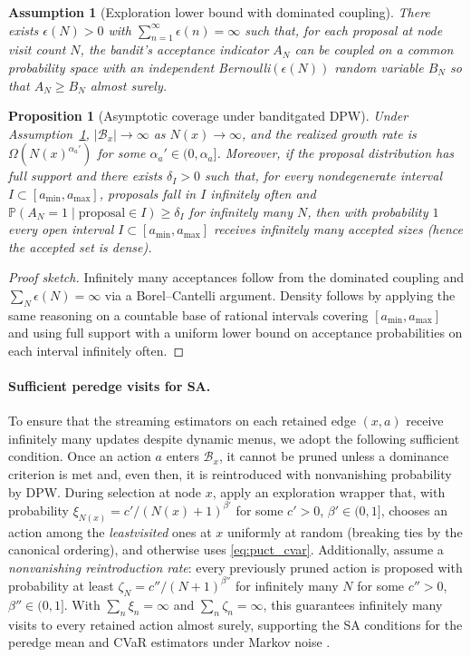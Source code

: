 \documentclass[10pt]{article}
\newcommand{\1}{\mathbf{1}}
\theoremstyle{plain}
\newtheorem{assumption}{Assumption}
\newtheorem{proposition}{Proposition}
\begin{document}
\begin{assumption}[Exploration lower bound with dominated coupling]
\label{ass:bandit}
There exists $\epsilon(N)>0$ with $\sum_{n=1}^\infty \epsilon(n)=\infty$ such that, for each proposal at node visit count $N$, the bandit’s acceptance indicator $A_N$ can be coupled on a common probability space with an \emph{independent} Bernoulli$(\epsilon(N))$ random variable $B_N$ so that $A_N\ge B_N$ almost surely.
\end{assumption}
\begin{proposition}[Asymptotic coverage under bandit\textendash gated DPW]
Under Assumption~\ref{ass:bandit}, $|\mathcal{B}_x|\to\infty$ as $N(x)\to\infty$, and the realized growth rate is $\Omega(N(x)^{\alpha_a'})$ for some $\alpha_a'\in(0,\alpha_a]$. Moreover, if the proposal distribution has full support and there exists $\delta_I>0$ such that, for every nondegenerate interval $I\subset[a_{\min},a_{\max}]$, proposals fall in $I$ infinitely often and $\mathbb{P}(A_N=1\mid \text{proposal}\in I)\ge \delta_I$ for infinitely many $N$, then with probability $1$ every open interval $I\subset[a_{\min},a_{\max}]$ receives infinitely many accepted sizes (hence the accepted set is dense).
\end{proposition}
\begin{proof}[Proof sketch]
Infinitely many acceptances follow from the dominated coupling and $\sum_N \epsilon(N)=\infty$ via a Borel--Cantelli argument. Density follows by applying the same reasoning on a countable base of rational intervals covering $[a_{\min},a_{\max}]$ and using full support with a uniform lower bound on acceptance probabilities on each interval infinitely often.
\end{proof}

\paragraph{Sufficient per\textendash edge visits for SA.}
To ensure that the streaming estimators on each retained edge $(x,a)$ receive infinitely many updates despite dynamic menus, we adopt the following sufficient condition. Once an action $a$ enters $\mathcal{B}_x$, it cannot be pruned unless a dominance criterion is met and, even then, it is reintroduced with nonvanishing probability by DPW. During selection at node $x$, apply an exploration wrapper that, with probability $\xi_{N(x)}=c'/(N(x)+1)^{\beta'}$ for some $c'>0$, $\beta'\in(0,1]$, chooses an action among the \emph{least\textendash visited} ones at $x$ uniformly at random (breaking ties by the canonical ordering), and otherwise uses \eqref{eq:puct_cvar}. Additionally, assume a \emph{nonvanishing reintroduction rate}: every previously pruned action is proposed with probability at least $\zeta_N=c''/(N+1)^{\beta''}$ for infinitely many $N$ for some $c''>0$, $\beta''\in(0,1]$. With $\sum_n \xi_n=\infty$ and $\sum_n \zeta_n=\infty$, this guarantees infinitely many visits to every retained action almost surely, supporting the SA conditions for the per\textendash edge mean and CVaR estimators under Markov noise \citep{borkar2008sa}.
\end{document}
